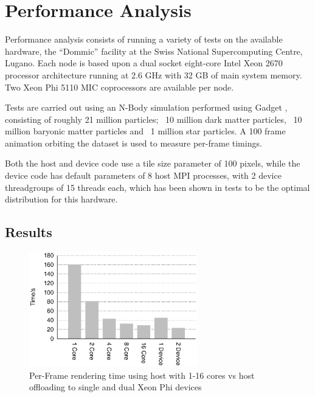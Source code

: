 \documentclass[runningheads,a4paper]{llncs}
\begin{document}
\section{Performance Analysis}
\label{sect:performance}

Performance analysis consists of running a variety of tests on the available hardware, the “Dommic” facility at the 
Swiss National Supercomputing Centre, Lugano. Each node is based upon a dual socket eight-core Intel Xeon 2670 
processor architecture running at 2.6 GHz with 32 GB of main system memory. Two Xeon Phi 5110 MIC coprocessors are 
available per node. 

Tests are carried out using an N-Body simulation performed using Gadget \cite{gadget}, consisting of roughly 21 million 
particles;  ~10 million dark matter particles, ~10 million baryonic matter particles and ~1 million star particles. 
A 100 frame animation orbiting the dataset is used to measure per-frame timings.

Both the host and device code use a tile size parameter of 100 pixels, while the device code has default parameters of 
8 host MPI processes, with 2 device threadgroups of 15 threads each, which has been shown in tests to be the optimal 
distribution for this hardware.


\subsection{Results}
\label{sect:results}

\begin{figure}
\centering
\includegraphics[height=5.0cm]{TotalTime}
\caption{Per-Frame rendering time using host with 1-16 cores vs host offloading to single and dual Xeon Phi devices}
\label{fig:totaltimes}
\end{figure}
\end{document}
